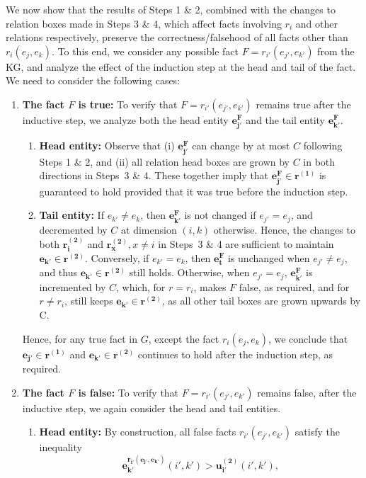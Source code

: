 \documentclass{article}
\begin{document}
We now show that the results of Steps 1 \& 2, combined with the changes to relation boxes made in Steps 3 \& 4, which affect facts involving $r_i$ and other relations respectively, preserve the correctness/falsehood of all facts other than $r_i(e_j,e_k)$. To this end, we consider any possible fact $F = r_{i'}(e_{j'}, e_{k'})$ from the KG, and analyze the effect of the induction step at the head and tail of the fact. We need to consider the following cases:
\begin{enumerate}[{Case} 1.]
    \item \textbf{The fact $F$ is true:} To verify that $F = r_{i'}(e_{j'}, e_{k'})$ remains true after the inductive step, we analyze both the head entity $\bm{e_{j'}^F}$ and the tail entity $\bm{e_{k'}^F}$. 
    \begin{enumerate}
        \item \textbf{Head entity:} Observe that (i) $\bm{e_{j'}^F}$ can change by at most $C$ following Steps 1 \& 2, and 
        (ii) all relation head boxes are grown by $C$ in both directions in Steps~3 \& 4. These together imply that $\bm{e_{j'}^F} \in \bm{r^{(1)}}$ is guaranteed to hold provided that it was true before the induction step.
        \item \textbf{Tail entity:} If $e_{k'} \neq e_k$, then $\bm{e_{k'}^F}$ is not changed if $e_{j'} = e_j$, and decremented by $C$ at dimension $(i,k)$ otherwise. Hence, the changes to both $\bm{r_{i}^{(2)}}$ and $\bm{r_{x}^{(2)}}, x \neq i$ in Steps~3 \& 4 are sufficient to maintain $\bm{e_{k'}} \in \bm{r^{(2)}}$. 
        Conversely, if $e_{k'} = e_k$, then $\bm{e_t^F}$ is unchanged when $e_{j'} \neq e_j$, and thus $\bm{e_{k'}} \in \bm{r^{(2)}}$ still holds. Otherwise, when $e_{j'} = e_j$, $\bm{e_{k'}^F}$ is incremented by $C$, which, for $r = r_i$, makes $F$ false, as required, and for $r \neq r_i$, still keeps $\bm{e_{k'}} \in \bm{r^{(2)}}$, as all other tail boxes are grown upwards by C. 
    \end{enumerate}
    Hence, for any true fact in $G$, except the fact $r_i(e_j,e_k)$, we conclude that $\bm{e_{j'}} \in \bm{r^{(1)}}$ and $\bm{e_{k'}} \in \bm{r^{(2)}}$ continues to hold after the induction step, as required. 
    \item \textbf{The fact $F$ is false:}  To verify that $F = r_{i'}(e_{j'}, e_{k'})$ remains false, after the inductive step, we again consider the head and tail entities.
    \begin{enumerate}
        \item \textbf{Head entity:} By construction, all false facts $r_{i'}(e_{j'}, e_{k'})$  satisfy the inequality \[{\bm{e_{k'}^{r_{i'}(e_{j'}, e_{k'})}}(i',k') > \bm{u_{i'}^{(2)}}(i',k')},\] 

\end{enumerate}
\end{enumerate}
\end{document}
